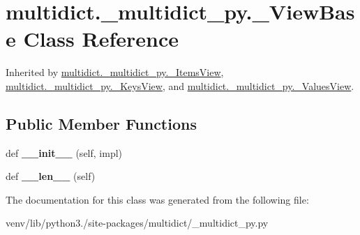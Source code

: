 \hypertarget{classmultidict_1_1__multidict__py_1_1___view_base}{}\section{multidict.\+\_\+multidict\+\_\+py.\+\_\+\+View\+Base Class Reference}
\label{classmultidict_1_1__multidict__py_1_1___view_base}


Inherited by \hyperlink{classmultidict_1_1__multidict__py_1_1___items_view}{multidict.\+\_\+multidict\+\_\+py.\+\_\+\+Items\+View}, \hyperlink{classmultidict_1_1__multidict__py_1_1___keys_view}{multidict.\+\_\+multidict\+\_\+py.\+\_\+\+Keys\+View}, and \hyperlink{classmultidict_1_1__multidict__py_1_1___values_view}{multidict.\+\_\+multidict\+\_\+py.\+\_\+\+Values\+View}.

\subsection*{Public Member Functions}
\begin{DoxyCompactItemize}
\item 
\mbox{\label{classmultidict_1_1__multidict__py_1_1___view_base_ab114741cf9413c4b0d700adb634d12f6}} 
def {\bfseries \+\_\+\+\_\+init\+\_\+\+\_\+} (self, impl)
\item 
\mbox{\label{classmultidict_1_1__multidict__py_1_1___view_base_a35b0d0352ac8e6bac0ef4245b96bdb3d}} 
def {\bfseries \+\_\+\+\_\+len\+\_\+\+\_\+} (self)
\end{DoxyCompactItemize}


The documentation for this class was generated from the following file\+:\begin{DoxyCompactItemize}
\item 
venv/lib/python3./site-\/packages/multidict/\+\_\+multidict\+\_\+py.\+py\end{DoxyCompactItemize}
